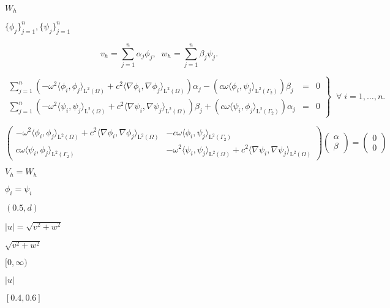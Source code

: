 \documentclass{article}
\begin{document}
$W_h$
\pagebreak

$\{\phi_j\}_{j=1}^n, \{\psi_j\}_{j=1}^n$
\pagebreak

\[ v_h = \sum_{j=1}^n \alpha_j \phi_j, \;\; w_h = \sum_{j=1}^n \beta_j \psi_j. \]
\pagebreak

\[ \renewcommand{\arraystretch}{2.0} \left.\begin{array}{ccc} \sum_{j=1}^n \left(-\omega^2 \langle \phi_i, \phi_j \rangle_{\mathrm{L}^2(\Omega)} +c^2 \langle \nabla \phi_i, \nabla \phi_j \rangle_{\mathrm{L}^2(\Omega)}\right)\alpha_j - \left(c\omega \langle \phi_i,\psi_j\rangle_{\mathrm{L}^2(\Gamma_2)}\right)\beta_j &=& 0 \\ \sum_{j=1}^n \left(-\omega^2 \langle \psi_i, \psi_j \rangle_{\mathrm{L}^2(\Omega)} +c^2 \langle \nabla \psi_i, \nabla \psi_j \rangle_{\mathrm{L}^2(\Omega)}\right)\beta_j + \left(c\omega \langle \psi_i,\phi_j\rangle_{\mathrm{L}^2(\Gamma_2)}\right)\alpha_j &=& 0 \end{array}\right\}\;\;\forall\; i =1,\ldots,n. \]
\pagebreak

\[ \renewcommand{\arraystretch}{2.0} \left( \begin{array}{cc} -\omega^2 \langle \phi_i, \phi_j \rangle_{\mathrm{L}^2(\Omega)} + c^2 \langle \nabla \phi_i, \nabla \phi_j \rangle_{\mathrm{L}^2(\Omega)} & -c\omega \langle \phi_i,\psi_j\rangle_{\mathrm{L}^2(\Gamma_2)} \\ c\omega \langle \psi_i,\phi_j\rangle_{\mathrm{L}^2(\Gamma_2)} & -\omega^2 \langle \psi_{i}, \psi_j \rangle_{\mathrm{L}^2(\Omega)} + c^2 \langle \nabla \psi_{i}, \nabla \psi_j \rangle_{\mathrm{L}^2(\Omega)} \end{array} \right) \left( \begin{array}{c} \alpha \\ \beta \end{array} \right) = \left( \begin{array}{c} 0 \\ 0 \end{array} \right) \]
\pagebreak

$V_h=W_h$
\pagebreak

$\phi_i = \psi_i$
\pagebreak

$(0.5, d)$
\pagebreak

$|u|=\sqrt{v^2+w^2}$
\pagebreak

$\sqrt{v^2+w^2}$
\pagebreak

$[0,\infty)$
\pagebreak

$|u|$
\pagebreak

$[0.4,0.6]$
\pagebreak
\end{document}
